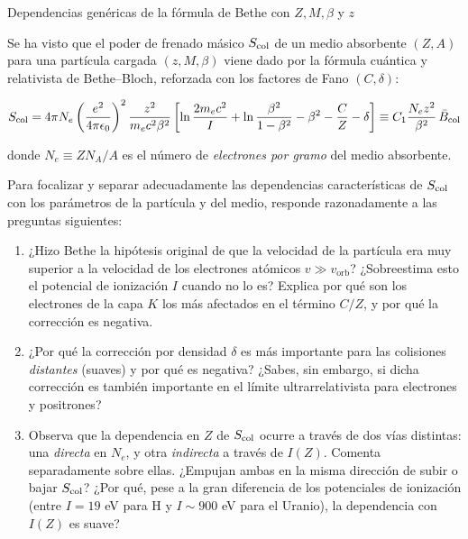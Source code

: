 \begin{Ejercicio}{Dependencias genéricas de la fórmula de Bethe con $Z, M, \beta$ y $z$} \label{Ej:02.04}
    

Se ha visto que el poder de frenado másico $S_\text{\text{col}}$ de un medio absorbente $(Z,A)$ para una 
partícula cargada $(z, M, \beta)$ viene dado por la fórmula cuántica y relativista de Bethe--Bloch, 
reforzada con los factores de Fano $(C,\delta)$:

\[
S_\text{\text{col}} = 4\pi N_e \left( \frac{e^2}{4\pi \epsilon_0} \right)^2 
\frac{z^2}{m_e c^2 \beta^2} 
\left[ \ln \frac{2 m_e c^2}{I} + \ln \frac{\beta^2}{1 - \beta^2} - \beta^2 - \frac{C}{Z} - \delta \right]
\equiv C_1 \frac{N_e z^2}{\beta^2} \, \bar{B}_\text{\text{col}}
\]

donde $N_e \equiv ZN_A/A$ es el número de \emph{electrones por gramo} del medio absorbente.  

Para focalizar y separar adecuadamente las dependencias características de $S_\text{\text{col}}$ con los  parámetros de la partícula y del medio, responde razonadamente a las preguntas siguientes:

\begin{enumerate}[label=\alph*)]

\item ¿Hizo Bethe la hipótesis original de que la velocidad de la partícula era muy superior a la 
velocidad de los electrones atómicos $v \gg v_\text{orb}$?  
¿Sobreestima esto el potencial de ionización $I$ cuando no lo es?  
Explica por qué son los electrones de la capa $K$ los más afectados en el término $C/Z$, y por qué la corrección es negativa.

\item ¿Por qué la corrección por densidad $\delta$ es más importante para las colisiones 
\emph{distantes} (suaves) y por qué es negativa?  
¿Sabes, sin embargo, si dicha corrección es también importante en el límite ultrarrelativista para electrones y positrones?

\item Observa que la dependencia en $Z$ de $S_\text{\text{col}}$ ocurre a través de dos vías distintas: 
una \emph{directa} en $N_e$, y otra \emph{indirecta} a través de $I(Z)$.  
Comenta separadamente sobre ellas.  
¿Empujan ambas en la misma dirección de subir o bajar $S_\text{\text{col}}$?  
¿Por qué, pese a la gran diferencia de los potenciales de ionización (entre $I=19$ eV para H y $I\sim 900$ eV para el Uranio), la dependencia con $I(Z)$ es suave?


\end{enumerate}
\end{Ejercicio}
